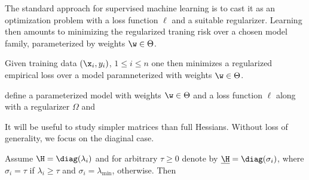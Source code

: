 

The standard approach for supervised machine learning is to cast it as an optimization problem with a loss function $\ell$ and a suitable regularizer. Learning then amounts to minimizing the regularized traning risk over a chosen model family, parameterized by weights  $\w \in \Theta$. 


 Given training data $(\x_i,y_i)$, $1 \le i \le n$ one then minimizes a regularized empirical loss over a model paramneterized with weights $\w \in \Theta$. 


define a parameterized model with weights $\w \in \Theta$  and a loss function $\ell$ along with a regularizer $\Omega$ and 

It will be useful to study simpler matrices than full Hessians. Without loss of generality, we focus on the diaginal case.  
\begin{lemma}
Assume $\H = \diag(\lambda_i)$  and for arbitrary $\tau \geq 0$ denote by $\underline\H=\diag(\sigma_i)$, where $\sigma_i = \tau$ if $\lambda_i \ge \tau$ and $\sigma_i = \lambda_{\min}$, otherwise. Then 
\end{lemma}
